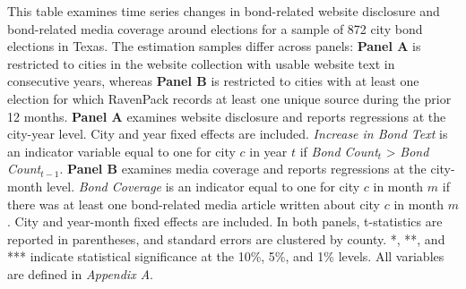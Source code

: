 
\clearpage
\begin{table}[H] \centering 
  \caption{\textbf{Texas GO bond referendums, website disclosure, and media coverage over time}}
  \label{tab:tx_election_time_series} 
 \parbox{\textwidth}{This table examines time series changes in bond-related website disclosure and bond-related media coverage around elections for a sample of 872 city bond elections in Texas. The estimation samples differ across panels: \textbf{Panel A} is restricted to cities in the website collection with usable website text in consecutive years, whereas \textbf{Panel B} is restricted to cities with at least one election for which RavenPack records at least one unique source during the prior 12 months. \textbf{Panel A} examines website disclosure and reports regressions at the city-year level. City and year fixed effects are included. \textit{Increase in Bond Text} is an indicator variable equal to one for city $c$ in year $t$ if \textit{Bond Count}$_t$ > \textit{Bond Count}$_{t-1}$. \textbf{Panel B} examines media coverage and reports regressions at the city-month level. \textit{Bond Coverage} is an indicator equal to one for city $c$ in month $m$ if there was at least one bond-related media article written about city $c$ in month $m$. City and year-month fixed effects are included. In both panels, t-statistics are reported in parentheses, and standard errors are clustered by county. *, **, and *** indicate statistical significance at the 10\%, 5\%, and 1\% levels. All variables are defined in \textit{Appendix A}.}
\vspace{10pt} %
\end{table}

\clearpage






\newpage
